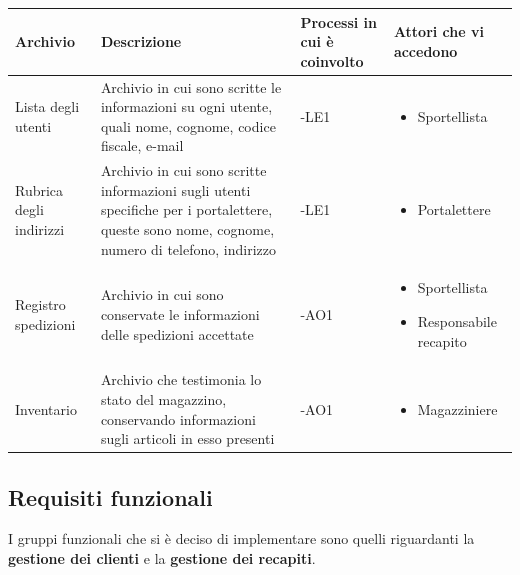 \documentclass[a4paper,12pt]{article}
\begin{document}
\begin{table}
  \centering
  \begin{tabular}{|>{\centering\arraybackslash}m{}|
                  >{\centering\arraybackslash}m{}|
                  >{\centering\arraybackslash}m{}|
                  >{\centering\arraybackslash}m{}|}
    \hline
    \textbf{Archivio} & \textbf{Descrizione} & \textbf{Processi in cui è coinvolto} & \textbf{Attori che vi accedono} \\ \hline
    Lista degli utenti & Archivio in cui sono scritte le informazioni su ogni utente, quali nome, cognome, codice fiscale, e-mail & -LE1 & \begin{itemize}
      \item Sportellista
    \end{itemize} \\ 
    \hline 
    Rubrica degli indirizzi & Archivio in cui sono scritte informazioni sugli utenti specifiche per i portalettere, queste sono nome, cognome, numero di telefono,
    indirizzo & -LE1 & \begin{itemize}
      \item Portalettere
    \end{itemize} \\ 
    \hline
    Registro spedizioni & Archivio in cui sono conservate le informazioni delle spedizioni accettate & -AO1 &
    \begin{itemize}
      \item{Sportellista}
      \item{Responsabile recapito}
    \end{itemize} \\
    \hline
    Inventario & Archivio che testimonia lo stato del magazzino, conservando informazioni sugli articoli in esso presenti & -AO1 &
    \begin{itemize}
      \item{Magazziniere}
    \end{itemize} \\
    \hline
  \end{tabular}
\end{table}

\newpage
\subsection{Requisiti funzionali}
I gruppi funzionali che si è deciso di implementare sono quelli riguardanti la \textbf{gestione dei clienti} e la \textbf{gestione dei recapiti}.
\end{document}
